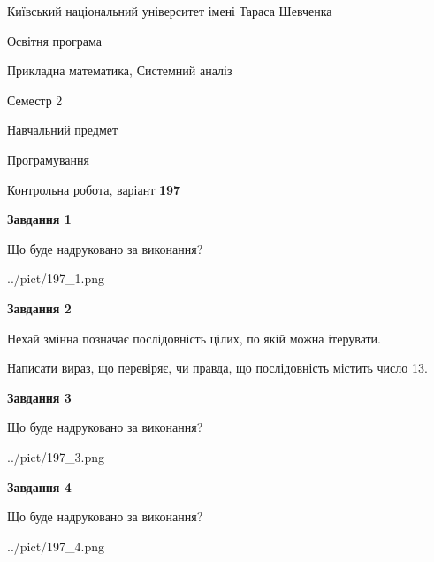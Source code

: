 \documentclass[12pt, ukrainian]{article}
\begin{document}
{{\begin {small}\par
{ \center  Київський національний університет імені Тараса Шевченка \par}
{\parbox {5 cm}{Освітня програма \hfill}{\parbox {8 cm}{Прикладна математика, Системний аналіз \hfill}}\parbox {5 cm}{\hfill Семестр 2}}\par
{\parbox {5 cm} {Навчальний предмет \hfill}\parbox {7 cm}{Програмування \hfill}\parbox {6cm}{\hfill}\par}\vspace{-7pt} \end{small}}{\center Контрольна робота, варіант  \No \textbf
{ 197 }\par}}
{
\begin {large}
{\begin {center}\textbf{Завдання 1}\end {center}}\par
Що буде надруковано за виконання?\par\par
\begin{center}
	{../pict/197_1.png}
\end{center}
\newpage

{\begin {center}\textbf{Завдання 2}\end {center}}\par
Нехай змінна  позначає послідовність цілих, по якій можна ітерувати.

Написати вираз, що перевіряє, чи правда, що послідовність  містить число 13.\par
\newpage

{\begin {center}\textbf{Завдання 3}\end {center}}\par
Що буде надруковано за виконання?\par
\begin{center}
	{../pict/197_3.png}
\end{center}
\newpage

{\begin {center}\textbf{Завдання 4}\end {center}}\par
Що буде надруковано за виконання?\par
\begin{center}
	{../pict/197_4.png}
\end{center}
\newpage


\end{large}}
\end{document}
